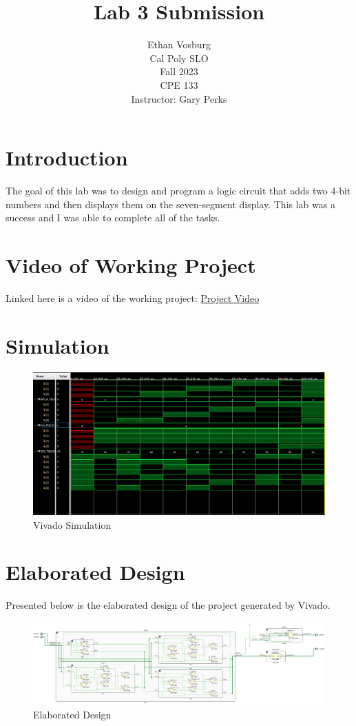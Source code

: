 \documentclass[12pt]{article}
\title{Lab 3 Submission}
\author{Ethan Vosburg\\
    Cal Poly SLO \\
    Fall 2023\\
    CPE 133\\
    Instructor: Gary Perks
}
\begin{document}
\maketitle

\newpage

\section{Introduction}

The goal of this lab was to design and program a logic circuit that adds two 4-bit numbers and then displays them on the seven-segment display. This lab was a success and I was able to complete all of the tasks.

\section{Video of Working Project}

Linked here is a video of the working project: \href{https://youtu.be/RuO1vYSFrW4}{Project Video}

\section{Simulation}

\begin{figure}[h]
    \centering
    \includegraphics[width=.8\textwidth]{Figures/CPE 133 Lab 3 Simulation.png}
    \caption{Vivado Simulation}
    \label{fig:simulation}
\end{figure}

\section{Elaborated Design}

Presented below is the elaborated design of the project generated by Vivado.

\begin{figure}[h]
    \centering
    \includegraphics[width=.95\textwidth]{Figures/CPE 133 Lab 3 Elaborated Design.png}
    \caption{Elaborated Design}
    \label{fig:elaborateddesign}
\end{figure}
\end{document}
